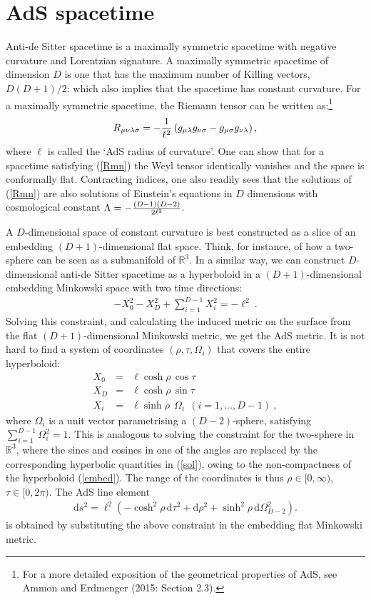 \documentclass[12pt]{article}
\def\nn{\nonumber}
\def\r{\rho}
\def\t{\tau}
\def\s{\sigma}
\def\dd{\mbox{d}}
\def\O{\Omega}
\def\l{\lambda}
\def\L{\Lambda}
\def\m{\mu}
\def\n{\nu}
\def\s{\sigma}
\def\r{\rho}
\def\t{\tau}
\renewcommand{\^}[1]{\hat{#1}}
\newcommand{\bea}{\begin{eqnarray}}
\newcommand{\eea}{\end{eqnarray}}
\newcommand{\eq}[1]{(\ref{#1})}
\def\nn{\nonumber\\}
\begin{document}
\section{AdS spacetime}\label{genpro}

Anti-de Sitter spacetime is a maximally symmetric spacetime with negative curvature and Lorentzian signature. A maximally symmetric spacetime of dimension $D$ is one that has the maximum number of Killing vectors, $D(D+1)/2$: which also implies that the spacetime has constant curvature. For a maximally symmetric spacetime, the Riemann tensor can be written as:\footnote{For a more detailed exposition of the geometrical properties of AdS, see Ammon and Erdmenger (2015: Section 2.3).}
\bea\label{Rmn}
R_{\m\n\l\s}=-{1\over\ell^2}\left(g_{\m\l}g_{\n\s}-g_{\m\s}g_{\n\l}\right),
\eea
where $\ell$ is called the `AdS radius of curvature'. One can show that for a spacetime satisfying \eq{Rmn} the Weyl tensor identically vanishes and the space is conformally flat. Contracting indices, one also readily sees that the solutions of \eq{Rmn} are also solutions of Einstein's equations in $D$ dimensions with cosmological constant $\L=-{(D-1)(D-2)\over2\ell^2}$.

A $D$-dimensional space of constant curvature is best constructed as a slice of an embedding  $(D+1)$-dimensional flat space. Think, for instance, of how a two-sphere can be seen as a submanifold of $\mathbb{R}^3$. In a similar way, we can construct $D$-dimensional anti-de Sitter spacetime as a hyperboloid in a $(D+1)$-dimensional embedding Minkowski space with two time directions:
\bea\label{embed}
-X_0^2-X_D^2+\sum_{i=1}^{D-1}X_i^2=-\ell^2~.
\eea
Solving  this constraint, and calculating the induced metric on the surface from the flat $(D+1)$-dimensional Minkowski metric, we get the AdS metric. It is not hard to find a system of coordinates $(\r,\t,\O_i)$ that covers the entire hyperboloid:
\bea\label{sol}
X_0&=&\ell\cosh\r\,\cos\t\nn
X_D&=&\ell\cosh\r\,\sin\t\nn
X_i&=&\ell\sinh\r~~\O_i~~(i=1,\ldots,D-1)~,
\eea
where $\Omega_i$ is a unit vector parametrising a $(D-2)$-sphere, satisfying $\sum_{i=1}^{D-1}\Omega_i^2=1$. This is analogous to solving the constraint for the two-sphere in ${\mathbb R}^3$, where the sines and cosines in one of the angles are replaced by the corresponding hyperbolic quantities in \eq{sol}, owing to the non-compactness of the hyperboloid \eq{embed}. The range of the coordinates is thus $\r\in[0,\infty)$, $\t\in[0,2\pi)$. The AdS line element 
\bea\label{global}
\dd s^2=\ell^2\left(-\cosh^2\r\,\dd\t^2+\dd\r^2+\sinh^2\r\,\dd\O_{D-2}^2\right).
\eea
is obtained by substituting the above constraint in the embedding flat Minkowski metric.
\end{document}
